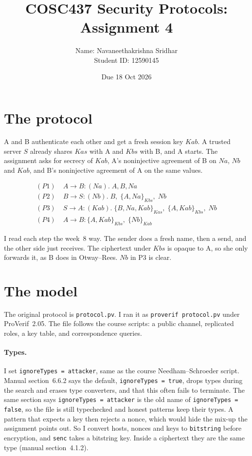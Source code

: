 \documentclass[11pt]{article}
\title{COSC437 Security Protocols: Assignment 4}
\author{Name: Navaneethakrishna Sridhar \\ Student ID: 12590145}
\date{Due 18 Oct 2026}
\newcommand{\enc}[2]{\{#1\}_{#2}}
\begin{document}
\maketitle


\section{The protocol}

A and B authenticate each other and get a fresh session key $Kab$. A trusted server $S$ already shares $Kas$ with A and $Kbs$ with B, and A starts. The assignment asks for secrecy of $Kab$, A's noninjective agreement of B on $Na$, $Nb$ and $Kab$, and B's noninjective agreement of A on the same values.

\begin{align*}
(P1)\;& A \rightarrow B : (Na).\; A, B, Na \\
(P2)\;& B \rightarrow S : (Nb).\; B,\; \enc{A, Na}{Kbs},\; Nb \\
(P3)\;& S \rightarrow A : (Kab).\; \enc{B, Na, Kab}{Kas},\; \enc{A, Kab}{Kbs},\; Nb \\
(P4)\;& A \rightarrow B : \enc{A, Kab}{Kbs},\; \enc{Nb}{Kab}
\end{align*}

I read each step the week~8 way. The sender does a fresh name, then a send, and the other side just receives. The ciphertext under $Kbs$ is opaque to A, so she only forwards it, as B does in Otway--Rees. $Nb$ in P3 is clear.

\section{The model}

The original protocol is \texttt{protocol.pv}. I ran it as \texttt{proverif protocol.pv} under ProVerif~2.05. The file follows the course scripts: a public channel, replicated roles, a key table, and correspondence queries.

\paragraph{Types.}
I set \texttt{ignoreTypes = attacker}, same as the course Needham--Schroeder script. Manual section~6.6.2 says the default, \texttt{ignoreTypes = true}, drops types during the search and erases type converters, and that this often fails to terminate. The same section says \texttt{ignoreTypes = attacker} is the old name of \texttt{ignoreTypes = false}, so the file is still typechecked and honest patterns keep their types. A pattern that expects a key then rejects a nonce, which would hide the mix-up the assignment points out. So I convert hosts, nonces and keys to \texttt{bitstring} before encryption, and \texttt{senc} takes a bitstring key. Inside a ciphertext they are the same type (manual section~4.1.2).
\end{document}

